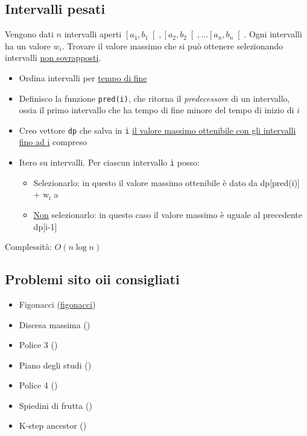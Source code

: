 \subsection{Intervalli pesati}\label{intervalli pesati}
Vengono dati $ n $ intervalli aperti $ \left[a_1, b_1\right[, \left[a_2, b_2\right[ , \ldots  \left[a_n, b_n\right[ $. Ogni intervalli ha un valore $ w_i $. Trovare il valore massimo che si può ottenere selezionando intervalli \underline{non sovrapposti}.

\vskip3mm\vskip3mm
\begin{itemize}
	\item Ordina intervalli per \underline{tempo di fine}
	\item Definisco la funzione \verb|pred(i)|, che ritorna il \textit{predecessore} di un intervallo, ossia il primo intervallo che ha tempo di fine minore del tempo di inizio di $ i $
	\item Creo vettore \verb|dp| che salva in \verb|i| \underline{il valore massimo ottenibile con gli intervalli fino ad {\ttfamily i}} compreso
	\item Itero su intervalli. Per ciascun intervallo \verb|i| posso:
	      \begin{itemize}
		      \item Selezionarlo: in questo il valore massimo ottenibile è dato da {\ttfamily dp[pred(i)] + $ \text{w}_{\text{i}} $} a
		      \item \underline{Non} selezionarlo: in questo caso il valore massimo è uguale al precedente {\ttfamily dp[i-1]}
	      \end{itemize}
\end{itemize}
Complessità: $ O\left(n \log n\right) $

\subsection{Problemi sito oii consigliati}
\begin{itemize}
	\item Figonacci (\protect\href{https://training.olinfo.it/task/ois_figonacci}{figonacci})
	\item Discesa massima ()
	\item Police 3 ()
	\item Piano degli studi ()
	\item Police 4 ()
	\item Spiedini di frutta ()
	\item K-step ancestor ()
\end{itemize}




